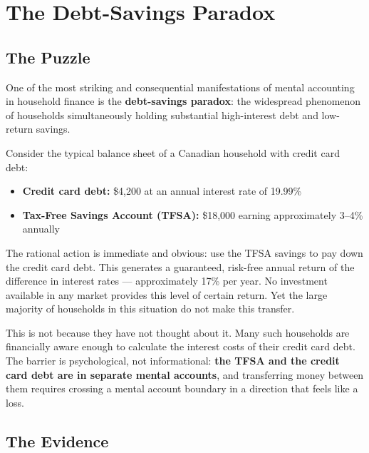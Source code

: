 \documentclass[12pt, letterpaper]{article}
\begin{document}
\medskip


\section{The Debt-Savings Paradox}



\subsection{The Puzzle}


One of the most striking and consequential manifestations of mental accounting in household finance is the \textbf{debt-savings paradox}: the widespread phenomenon of households simultaneously holding substantial high-interest debt and low-return savings.

Consider the typical balance sheet of a Canadian household with credit card debt:
\begin{itemize}
\item \textbf{Credit card debt:} \$4,200 at an annual interest rate of 19.99\%
\item \textbf{Tax-Free Savings Account (TFSA):} \$18,000 earning approximately 3--4\% annually
\end{itemize}

The rational action is immediate and obvious: use the TFSA savings to pay down the credit card debt. This generates a guaranteed, risk-free annual return of the difference in interest rates --- approximately 17\% per year. No investment available in any market provides this level of certain return. Yet the large majority of households in this situation do not make this transfer.

This is not because they have not thought about it. Many such households are financially aware enough to calculate the interest costs of their credit card debt. The barrier is psychological, not informational: \textbf{the TFSA and the credit card debt are in separate mental accounts}, and transferring money between them requires crossing a mental account boundary in a direction that feels like a loss.


\subsection{The Evidence}
\end{document}
